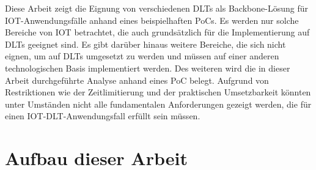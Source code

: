Diese Arbeit zeigt die Eignung von verschiedenen \ac{DLT}s als Backbone-Lösung für \ac{IOT}-Anwendungsfälle anhand eines beispielhaften \ac{PoC}s. Es werden nur solche Bereiche von \ac{IOT} betrachtet, die auch grundsätzlich für die Implementierung auf \ac{DLT}s geeignet sind. Es gibt darüber hinaus weitere Bereiche, die sich nicht eignen, um auf \ac{DLT}s umgesetzt zu werden und müssen auf einer anderen technologischen Basis implementiert werden. Des weiteren wird die in dieser Arbeit durchgeführte Analyse anhand eines \ac{PoC} belegt. Aufgrund von Restriktionen wie der Zeitlimitierung und der praktischen Umsetzbarkeit könnten unter Umständen nicht alle fundamentalen Anforderungen gezeigt werden, die für einen \ac{IOT}-\ac{DLT}-Anwendungsfall erfüllt sein müssen.


%
%
\section{Aufbau dieser Arbeit}
\label{sec:intro:structure}
\lipsum[1-1]
